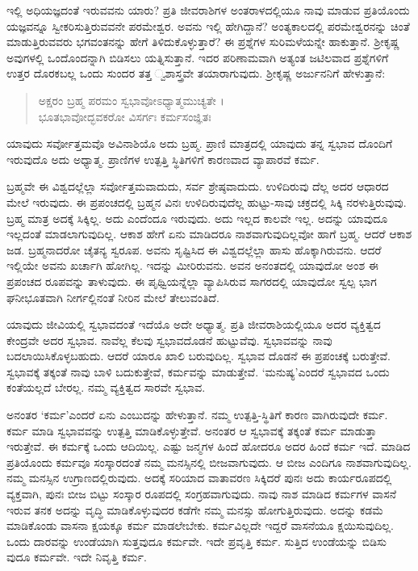 ಇಲ್ಲಿ ಅಧಿಯಜ್ಞದಂತೆ ಇರುವವನು ಯಾರು? ಪ್ರತಿ ಜೀವರಾಶಿಗಳ ಅಂತರಾಳದಲ್ಲಿಯೂ ನಾವು ಮಾಡುವ ಪ್ರತಿಯೊಂದು ಯಜ್ಞವನ್ನೂ ಸ್ವೀಕರಿಸುತ್ತಿರುವವನೇ ಪರಮೇಶ್ವರ. ಅವನು ಇಲ್ಲಿ ಹೇಗಿದ್ದಾನೆ? ಅಂತ್ಯಕಾಲದಲ್ಲಿ ಪರಮೇಶ್ವರನನ್ನು ಚಿಂತೆ ಮಾಡುತ್ತಿರುವವರು ಭಗವಂತನನ್ನು ಹೇಗೆ ತಿಳಿದುಕೊಳ್ಳುತ್ತಾರೆ? ಈ ಪ್ರಶ್ನೆಗಳ ಸುರಿಮಳೆಯನ್ನೇ ಹಾಕುತ್ತಾನೆ. ಶ್ರೀಕೃಷ್ಣ ಅವುಗಳಲ್ಲಿ ಒಂದೊಂದನ್ನಾಗಿ ಬಿಡಿಸಲು ಯತ್ನಿಸುತ್ತಾನೆ. ಇದರ ಪರಿಣಾಮವಾಗಿ ಅತ್ಯಂತ ಜಟಿಲವಾದ ಪ್ರಶ್ನೆಗಳಿಗೆ ಉತ್ತರ ದೊರಕಬಲ್ಲ ಒಂದು ಸುಂದರ ತತ್ತ ್ವಶಾಸ್ತ್ರವೇ ತಯಾರಾಗುವುದು. ಶ್ರೀಕೃಷ್ಣ ಅರ್ಜುನನಿಗೆ ಹೇಳುತ್ತಾನೆ:

\begin{verse}
ಅಕ್ಷರಂ ಬ್ರಹ್ಮ ಪರಮಂ ಸ್ವಭಾವೋಽಧ್ಯಾತ್ಮಮುಚ್ಯತೇ ।\\ಭೂತಭಾವೋದ್ಭವಕರೋ ವಿಸರ್ಗಃ ಕರ್ಮಸಂಜ್ಞಿತಃ 
\end{verse}

{\small ಯಾವುದು ಸರ್ವೋತ್ತಮವೊ ಅವಿನಾಶಿಯೊ ಅದು ಬ್ರಹ್ಮ. ಪ್ರಾಣಿ ಮಾತ್ರದಲ್ಲಿ ಯಾವುದು ತನ್ನ ಸ್ವಭಾವ ದೊಂದಿಗೆ ಇರುವುದೊ ಅದು ಅಧ್ಯಾತ್ಮ. ಪ್ರಾಣಿಗಳ ಉತ್ಪತ್ತಿ ಸ್ಥಿತಿಗಳಿಗೆ ಕಾರಣವಾದ ವ್ಯಾಪಾರವೆ ಕರ್ಮ.}

ಬ್ರಹ್ಮವೇ ಈ ವಿಶ್ವದಲ್ಲೆಲ್ಲಾ ಸರ್ವೋತ್ತಮವಾದುದು, ಸರ್ವ ಶ್ರೇಷ್ಠವಾದುದು. ಉಳಿದಿರುವು ದೆಲ್ಲ ಅದರ ಆಧಾರದ ಮೇಲೆ ಇರುವುದು. ಈ ಪ್ರಪಂಚದಲ್ಲಿ ಬ್ರಹ್ಮನ ವಿನಃ ಉಳಿದಿರುವುದೆಲ್ಲ ಹುಟ್ಟು-ಸಾವು ಚಕ್ರದಲ್ಲಿ ಸಿಕ್ಕಿ ನರಳುತ್ತಿರುವುವು. ಬ್ರಹ್ಮ ಮಾತ್ರ ಅದಕ್ಕೆ ಸಿಕ್ಕಿಲ್ಲ. ಅದು ಎಂದೆಂದೂ ಇರುವುದು. ಅದು ಇಲ್ಲದ ಕಾಲವೇ ಇಲ್ಲ. ಅದನ್ನು ಯಾವುದೂ ಇಲ್ಲದಂತೆ ಮಾಡಲಾಗುವುದಿಲ್ಲ. ಆಕಾಶ ಹೇಗೆ ಏನು ಮಾಡಿದರೂ ನಾಶವಾಗುವುದಿಲ್ಲವೋ ಹಾಗೆ ಬ್ರಹ್ಮ. ಆದರೆ ಆಕಾಶ ಜಡ. ಬ್ರಹ್ಮನಾದರೋ ಚೈತನ್ಯ ಸ್ವರೂಪ. ಅವನು ಸೃಷ್ಟಿಸಿದ ಈ ವಿಶ್ವದಲ್ಲೆಲ್ಲಾ ಹಾಸು ಹೊಕ್ಕಾಗಿರುವನು. ಆದರೆ ಇಲ್ಲಿಯೇ ಅವನು ಖರ್ಚಾಗಿ ಹೋಗಿಲ್ಲ. ಇದನ್ನು ಮೀರಿರುವನು. ಅವನ ಅನಂತದಲ್ಲಿ ಯಾವುದೋ ಅಂಶ ಈ ಪ್ರಪಂಚದ ರೂಪವನ್ನು ತಾಳುವುದು. ಈ ಪೃಥ್ವಿಯನ್ನೆಲ್ಲಾ ವ್ಯಾಪಿಸಿರುವ ಸಾಗರದಲ್ಲಿ ಯಾವುದೋ ಸ್ವಲ್ಪ ಭಾಗ ಘನೀಭೂತವಾಗಿ ನೀರ್ಗಲ್ಲಿನಂತೆ ನೀರಿನ ಮೇಲೆ ತೇಲುವಂತಿದೆ.

ಯಾವುದು ಜೀವಿಯಲ್ಲಿ ಸ್ವಭಾವದಂತೆ ಇದೆಯೊ ಅದೇ ಅಧ್ಯಾತ್ಮ. ಪ್ರತಿ ಜೀವರಾಶಿಯಲ್ಲಿಯೂ ಅದರ ವ್ಯಕ್ತಿತ್ವದ ಕೇಂದ್ರವೇ ಅದರ ಸ್ವಭಾವ. ನಾವೆಲ್ಲ ಕೆಲವು ಸ್ವಭಾವದೊಡನೆ ಹುಟ್ಟುವೆವು. ಸ್ವಭಾವವನ್ನು ನಾವು ಬದಲಾಯಿಸಿಕೊಳ್ಳಬಹುದು. ಆದರೆ ಯಾರೂ ಖಾಲಿ ಬರುವುದಿಲ್ಲ. ಸ್ವಭಾವ ದೊಡನೆ ಈ ಪ್ರಪಂಚಕ್ಕೆ ಬರುತ್ತೇವೆ. ಸ್ವಭಾವಕ್ಕೆ ತಕ್ಕಂತೆ ನಾವು ಬಾಳಿ ಬದುಕುತ್ತೇವೆ, ಕರ್ಮವನ್ನು ಮಾಡುತ್ತೇವೆ. ‘ಮನುಷ್ಯ’ಎಂದರೆ ಸ್ವಭಾವದ ಒಂದು ಕಂತೆಯಲ್ಲದೆ ಬೇರಲ್ಲ. ನಮ್ಮ ವ್ಯಕ್ತಿತ್ವದ ಸಾರವೇ ಸ್ವಭಾವ.

ಅನಂತರ ‘ಕರ್ಮ’ಎಂದರೆ ಏನು ಎಂಬುದನ್ನು ಹೇಳುತ್ತಾನೆ. ನಮ್ಮ ಉತ್ಪತ್ತಿ-ಸ್ಥಿತಿಗೆ ಕಾರಣ ವಾಗಿರುವುದೇ ಕರ್ಮ. ಕರ್ಮ ಮಾಡಿ ಸ್ವಭಾವವನ್ನು ಉತ್ಪತ್ತಿ ಮಾಡಿಕೊಳ್ಳುತ್ತೇವೆ. ಅನಂತರ ಆ ಸ್ವಭಾವಕ್ಕೆ ತಕ್ಕಂತೆ ಕರ್ಮ ಮಾಡುತ್ತಾ ಇರುತ್ತೇವೆ. ಈ ಕರ್ಮಕ್ಕೆ ಒಂದು ಆದಿಯಿಲ್ಲ. ಎಷ್ಟು ಜನ್ಮಗಳ ಹಿಂದೆ ಹೋದರೂ ಅದರ ಹಿಂದೆ ಕರ್ಮ ಇದೆ. ಮಾಡಿದ ಪ್ರತಿಯೊಂದು ಕರ್ಮವೂ ಸಂಸ್ಕಾರದಂತೆ ನಮ್ಮ ಮನಸ್ಸಿನಲ್ಲಿ ಬೀಜವಾಗುವುದು. ಆ ಬೀಜ ಎಂದಿಗೂ ನಾಶವಾಗುವುದಿಲ್ಲ. ನಮ್ಮ ಮನಸ್ಸಿನ ಉಗ್ರಾಣದಲ್ಲಿರುವುದು. ಅದಕ್ಕೆ ಸರಿಯಾದ ವಾತಾವರಣ ಸಿಕ್ಕಿದರೆ ಪುನಃ ಅದು ಕಾರ್ಯರೂಪದಲ್ಲಿ ವ್ಯಕ್ತವಾಗಿ, ಪುನಃ ಬೀಜ ಬಿಟ್ಟು ಸಂಸ್ಕಾರ ರೂಪದಲ್ಲಿ ಸಂಗ್ರಹವಾಗುವುದು. ನಾವು ನಾಶ ಮಾಡಿದ ಕರ್ಮಗಳ ವಾಸನೆ ಇರುವ ತನಕ ಅದನ್ನು ವೃದ್ಧಿ ಮಾಡಿಕೊಳ್ಳುವುದರ ಕಡೆಗೇ ನಮ್ಮ ಮನಸ್ಸು ಹೋಗುತ್ತಿರುವುದು. ಅದನ್ನು ಕಡಮೆ ಮಾಡಿಕೊಂಡು ವಾಸನಾ ಕ್ಷಯಕ್ಕೂ ಕರ್ಮ ಮಾಡಲೇಬೇಕು. ಕರ್ಮವಿಲ್ಲದೇ ಇದ್ದರೆ ವಾಸನೆಯೂ ಕ್ಷಯಿಸುವುದಿಲ್ಲ. ಒಂದು ದಾರವನ್ನು ಉಂಡೆಯಾಗಿ ಸುತ್ತವುದೂ ಕರ್ಮವೇ. ಇದೇ ಪ್ರವೃತ್ತಿ ಕರ್ಮ. ಸುತ್ತಿದ ಉಂಡೆಯನ್ನು ಬಿಡಿಸು ವುದೂ ಕರ್ಮವೇ. ಇದೇ ನಿವೃತ್ತಿ ಕರ್ಮ.

